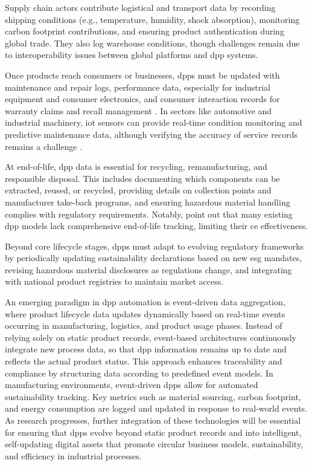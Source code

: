 Supply chain actors contribute logistical and transport data by recording shipping conditions (e.g., temperature, humidity, shock absorption), monitoring carbon footprint contributions, and ensuring product authentication during global trade. They also log warehouse conditions, though challenges remain due to interoperability issues between global platforms and \ac{dpp} systems. \autocite{Jensen.2024, Pietron.2023}

Once products reach consumers or businesses, \ac{dpp}s must be updated with maintenance and repair logs, performance data, especially for industrial equipment and consumer electronics, and consumer interaction records for warranty claims and recall management \autocite{Jensen.2024}. In sectors like automotive and industrial machinery, \ac{iot} sensors can provide real-time condition monitoring and predictive maintenance data, although verifying the accuracy of service records remains a challenge \autocite{Pietron.2023}.

At end-of-life, \ac{dpp} data is essential for recycling, remanufacturing, and responsible disposal. This includes documenting which components can be extracted, reused, or recycled, providing details on collection points and manufacturer take-back programs, and ensuring hazardous material handling complies with regulatory requirements. \autocite{Jensen.2024, EuropeanParliamentandCouncil.2024} Notably, \textcite{Jensen.2023} point out that many existing \ac{dpp} models lack comprehensive end-of-life tracking, limiting their \ac{ce} effectiveness.

Beyond core lifecycle stages, \ac{dpp}s must adapt to evolving regulatory frameworks by periodically updating sustainability declarations based on new \ac{esg} mandates, revising hazardous material disclosures as regulations change, and integrating with national product registries to maintain market access. \autocite{Jensen.2023, Pietron.2023, EuropeanParliamentandCouncil.2024}

An emerging paradigm in \ac{dpp} automation is event-driven data aggregation, where product lifecycle data updates dynamically based on real-time events occurring in manufacturing, logistics, and product usage phases. Instead of relying solely on static product records, event-based architectures continuously integrate new process data, so that \ac{dpp} information remains up to date and reflects the actual product status. This approach enhances traceability and  compliance by structuring data according to predefined event models. In manufacturing environments, event-driven \ac{dpp}s allow for automated sustainability tracking. Key metrics such as material sourcing, carbon footprint, and energy consumption are logged and updated in response to real-world events. As research progresses, further integration of these technologies will be essential for ensuring that \ac{dpp}s evolve beyond static product records and into intelligent, self-updating digital assets that promote circular business models, sustainability, and efficiency in industrial processes. \autocite{Ajdinovic.2024, Plociennik.2022}


